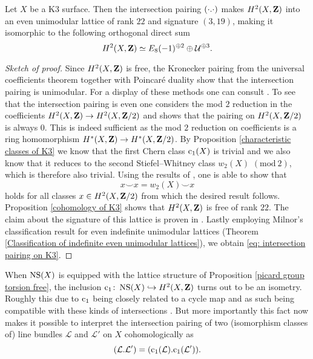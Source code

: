 \begin{proposition}
    \label{intersection pairing on K3 is even}
    \emph{\cite[\S 1, Proposition 3.5]{Huybrechts2016}}
    Let $X$ be a K3 surface. Then the intersection pairing $(\cdot.\cdot)$ makes $H^{2}(X, \mathbf Z)$ into an even unimodular lattice of rank $22$ and signature $(3,19)$, making it isomorphic to the following orthogonal direct sum
    \begin{equation}
        \label{eq: intersection pairing on K3}
        H^{2}(X, \mathbf Z) \simeq E_8(-1)^{\oplus 2} \oplus \mathcal U^{\oplus 3}.
    \end{equation}
\end{proposition}

\begin{proof}[Sketch of proof]
    Since $H^{2}(X, \mathbf Z)$ is free, the Kronecker pairing from the universal coefficients theorem together with Poincaré duality show that the intersection pairing is unimodular. For a display of these methods one can consult \cite[\S VI.9]{Bredon1993}. To see that the intersection pairing is even one considers the mod $2$ reduction in the coefficients $H^{2}(X, \mathbf Z) \to H^{2}(X, \mathbf Z/2)$ and shows that the pairing on $H^{2}(X, \mathbf Z/2)$ is always $0$. This is indeed sufficient as the mod $2$ reduction on coefficients is a ring homomorphism $H^{*}(X, \mathbf Z) \to H^{*}(X, \mathbf Z/2)$. By Proposition \ref{characteristic classes of K3} we know that the first Chern class $\cclass[1](X)$ is trivial and we also know that it reduces to the second Stiefel--Whitney class $w_2(X)$ $\mathrm{(mod \ 2)}$, which is therefore also trivial. Using the results of \cite[\S VI.17]{Bredon1993}, one is able to show that
    \[
        x \smallsmile x = w_2(X) \smallsmile x
    \]
    holds for all classes $x \in H^{2}(X, \mathbf Z/2)$ from which the desired result follows. Proposition \ref{cohomology of K3} shows that $H^{2}(X, \mathbf Z)$ is free of rank $22$. The claim about the signature of this lattice is proven in \cite[\S 1, Proposition 3.5]{Huybrechts2016}. Lastly employing Milnor's classification result for even indefinite unimodular lattices (Theorem \ref{Classification of indefinite even unimodular lattices}), we obtain \eqref{eq: intersection pairing on K3}.
\end{proof}

\begin{remark}
    When $\operatorname{NS}(X)$ is equipped with the lattice structure of Proposition \ref{picard group torsion free}, the inclusion $\cclass[1] \colon \NS{X} \hookrightarrow \cohom{2}{X}{\Z}$ turns out to be an isometry. Roughly this due to $\cclass[1]$ being closely related to a cycle map and as such being compatible with these kinds of intersections \cite[\S 19]{Fulton1998}. But more importantly this fact now makes it possible to interpret the intersection pairing
    of two (isomorphism classes of) line bundles $\mathcal L$ and $\mathcal L'$  on $X$ cohomologically as 
    \[
        \intersect{\mathcal L}{\mathcal L'} = \intersect{\cclass[1](\mathcal L)}{\cclass[1](\mathcal{L'})}.
    \]
\end{remark}

